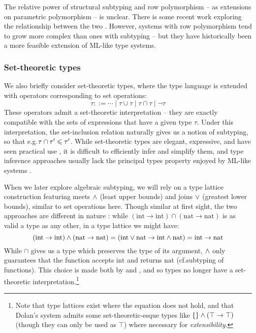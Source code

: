 The relative power of structural subtyping and row polymorphism -- as extensions on parametric polymorphism -- is unclear.
There is some recent work exploring the relationship between the two \cite{disjoint-polymorphism, structural-subtyping-as-parameric-polymorphism}. However, systems with row polymorphism tend to grow more complex than ones with subtyping \cite{castagna-polymorphic-variants} -- but they have historically been a more feasible extension of ML-like type systems.

\subsubsection{Set-theoretic types}

We also briefly consider set-theoretic types, where the type language is extended with operators corresponding to set operations:
$$ \tau ::= \cdots \mid \tau \cup \tau \mid \tau \cap \tau \mid \lnot \tau $$
These operators admit a set-theoretic interpretation -- they are exactly compatible with the sets of expressions that have a given type $\tau$. 
Under this interpretation, the set-inclusion relation naturally gives us a notion of subtyping, so that e.g.\@ $\tau \cap \tau' \leqslant \tau'$.
While set-theoretic types are elegant, expressive, and have seen practical use \cite{erlang-set-theoretic-types}, it is difficult to efficiently infer and simplify them, and type inference approaches usually lack the principal types property enjoyed by ML-like systems \cite{mlstruct, castagna-dynamic}. 

When we later explore algebraic subtyping, we will rely on a type lattice construction featuring meets $\land$ (least upper bounds) and joins $\lor$ (greatest lower bounds), similar to set operations here. Though similar at first sight, the two approaches are different in nature \cite{mlstruct}: while $(\mathrm{int} \to \mathrm{int}) \cap (\mathrm{nat} \to \mathrm{nat})$ is as valid a type as any other, in a type lattice we might have: $$(\mathrm{int} \to \mathrm{int}) \land (\mathrm{nat} \to \mathrm{nat}) = (\mathrm{int} \lor \mathrm{nat} \to \mathrm{int} \land \mathrm{nat}) =\mathrm{int} \to \mathrm{nat} $$
While $\cap$ gives us a type which preserves the type of its argument, $\land$ only guarantees that the function accepts $\mathrm{int}$ and returns $\mathrm{nat}$ (cf.\@ subtyping of functions).
This choice is made both by \textcite{mlsub} and \textcite{mlstruct}, and so types no longer have a set-theoretic interpretation.\footnote{Note that type lattices exist where the equation does not hold, and that Dolan's system admits some set-theoretic-esque types like $\{\} \land (\top \to \top)$ (though they can only be used as $\top$) where necessary for \emph{extensibility}.}

